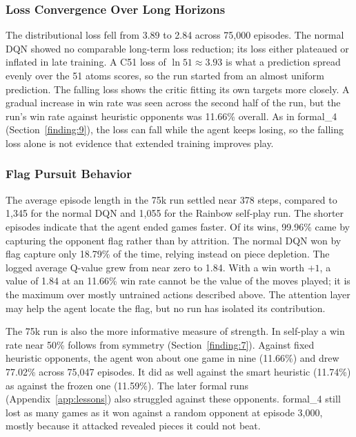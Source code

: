 \subsubsection{Loss Convergence Over Long Horizons}\label{finding:13}
The distributional loss fell from 3.89 to 2.84 across 75,000 episodes. The normal DQN showed no comparable long-term loss reduction; its loss either plateaued or inflated in late training. A C51 loss of $\ln 51 \approx 3.93$ is what a prediction spread evenly over the 51 atoms scores, so the run started from an almost uniform prediction. The falling loss shows the critic fitting its own targets more closely. A gradual increase in win rate was seen across the second half of the run, but the run's win rate against heuristic opponents was 11.66\% overall. As in formal\_4 (Section~\ref{finding:9}), the loss can fall while the agent keeps losing, so the falling loss alone is not evidence that extended training improves play.

\subsubsection{Flag Pursuit Behavior}\label{finding:14}
The average episode length in the 75k run settled near 378 steps, compared to 1,345 for the normal DQN and 1,055 for the Rainbow self-play run. The shorter episodes indicate that the agent ended games faster. Of its wins, 99.96\% came by capturing the opponent flag rather than by attrition. The normal DQN won by flag capture only 18.79\% of the time, relying instead on piece depletion. The logged average Q-value grew from near zero to 1.84. With a win worth $+1$, a value of 1.84 at an 11.66\% win rate cannot be the value of the moves played; it is the maximum over mostly untrained actions described above. The attention layer may help the agent locate the flag, but no run has isolated its contribution.

The 75k run is also the more informative measure of strength. In self-play a win rate near 50\% follows from symmetry (Section~\ref{finding:7}). Against fixed heuristic opponents, the agent won about one game in nine (11.66\%) and drew 77.02\% across 75,047 episodes. It did as well against the smart heuristic (11.74\%) as against the frozen one (11.59\%). The later formal runs (Appendix~\ref{app:lessons}) also struggled against these opponents. formal\_4 still lost as many games as it won against a random opponent at episode 3,000, mostly because it attacked revealed pieces it could not beat.

